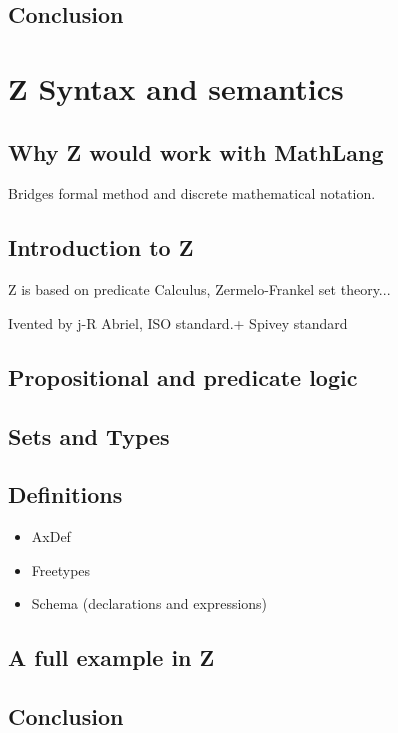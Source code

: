 \subsection{Conclusion}

\section{Z Syntax and semantics}

\subsection{Why Z would work with MathLang}

Bridges formal method and discrete mathematical notation.

\subsection{Introduction to Z}

Z is based on predicate Calculus, Zermelo-Frankel set theory...

Ivented by j-R Abriel, ISO standard.+ Spivey standard

\subsection{Propositional and predicate logic}

\subsection{Sets and Types}

\subsection{Definitions}

\begin{itemize}
\item AxDef
\item Freetypes
\item Schema (declarations and expressions)
\end{itemize}

\subsection{A full example in Z}


\subsection{Conclusion}

